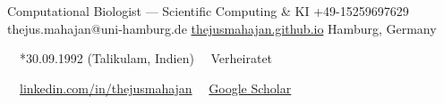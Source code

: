 \documentclass{thejus_cv}
\begin{document}
         {Computational Biologist --- Scientific Computing \& KI}
         {+49-15259697629}
         {thejus.mahajan@uni-hamburg.de}
         {\href{https://thejusmahajan.github.io}{thejusmahajan.github.io}}
         {Hamburg, Germany}

\vspace{-0.5cm}
{\small\color{white}
\faCalendar\ \ *30.09.1992 (Talikulam, Indien) \hspace{0.5cm} \faUser\ \ Verheiratet
}\par
\vspace{0.1cm}
{\small\color{white}
\faLinkedin\ \ \href{https://www.linkedin.com/in/thejusmahajan/}{linkedin.com/in/thejusmahajan}
\hspace{0.5cm}
\faGraduationCap\ \ \href{https://scholar.google.com/citations?user=PJkZwAwAAAAJ}{Google Scholar}
}\par
\vspace{0.1cm}
\end{document}

